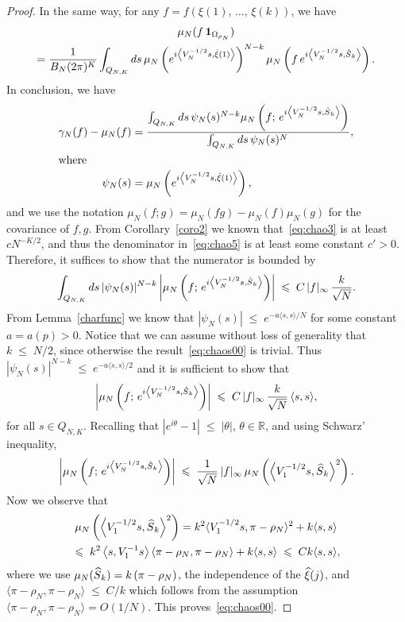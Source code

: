 \documentclass[AHL,Unicode,longabstracts,published]{cedram}
\renewcommand{\leq}{\;\leqslant\;}
\newcommand{\scalar}[2]{\langle #1, #2\rangle}
\newcommand{\ind}{\mathbf{1}}
\newcommand{\bbR}{\mathbb{R}}
\let\g=\gamma
\let\r=\rho
\let\O=\Omega
\let\oldhat\hat
\renewcommand*{\hat}[1]{\mathchoice{\widehat{#1}}{\widehat{#1}}{\oldhat{#1}}{\oldhat{#1}}}
\begin{document}
\begin{proof}
In the same way, for any $f=f(\xi(1),\,\dots,\,\xi(k))$, we have
\begin{multline}\label{eq:chao4}
\mu_N(f\,\ind_{\O_{\r_N}})\\
=\frac1{B_N(2\pi)^K}\int_{Q_{N,K}}d s \,\mu_N\left(e^{i\left\langle V_N^{-1/2} s,\hat\xi(1)\right\rangle}\right)^{N-k}\mu_N\left(f \,e^{i\left\langle V_N^{-1/2} s,\hat S_k\right\rangle}\right).
\end{multline}
In conclusion, we have
\begin{align}
\g_N(f)-\mu_N(f) &=\frac{\int_{Q_{N,K}}d s \,\psi_N(s)^{N-k}\mu_N\left(f; \,e^{i\left\langle V_N^{-1/2} s,\hat S_k\right\rangle}\right)}{
\int_{Q_{N,K}}d s \,\psi_N(s)^{N}\,},\label{eq:chao5}
\\
\intertext{where}
\psi_N(s) &=\mu_N\left(e^{i\left\langle V_N^{-1/2} s,\hat\xi(1)\right\rangle}\right),\nonumber
\end{align}
and we use the notation $\mu_N(f; g)=\mu_N(fg)-\mu_N(f)\mu_N(g)$ for the covariance of $f,g$. From Corollary~\ref{coro2} we known that~\eqref{eq:chao3} is at least $cN^{-K/2}$, and thus the denominator in~\eqref{eq:chao5} is at least some constant $c'>0$.
Therefore, it suffices to show that the numerator is bounded by
\begin{align}\label{eq:chao6}
\int_{Q_{N,K}}d s \,|\psi_N(s)|^{N-k}\left|\mu_N\left(f ;\,e^{i\left\langle V_N^{-1/2} s,\hat S_k\right\rangle}\right)\right|\leq C \,|f|_\infty\,\frac{k}{\sqrt N}.
\end{align}
From Lemma~\ref{charfunc} we know that $|\psi_N(s)|\leq e^{-a \scalar{s}{s}/N}$ for some constant $a=a(p)>0$. Notice that we can assume without loss of generality that $k\leq N/2$, since otherwise the result~\eqref{eq:chaos00} is trivial. Thus $|\psi_N(s)|^{N-k} \leq e^{-a \scalar{s}{s}/2}$ and it is sufficient to show that
\begin{align}\label{eq:chao7}
\left|\mu_N\left(f; \,e^{i\left\langle V_N^{-1/2} s,\hat S_k\right\rangle}\right)\right|\leq C \,|f|_\infty\,\frac{k}{\sqrt N}\,\scalar{s}{s},
\end{align}
for all $s\in Q_{N,K}$. Recalling that $|e^{i\theta}-1|\leq |\theta|$, $\theta\in\bbR$, and using Schwarz' inequality,
\begin{align}\label{eq:chao71}
\left|\mu_N\left(f; \,e^{i\left\langle V_N^{-1/2} s,\hat S_k\right\rangle}
\right)\right|
\leq \frac1{\sqrt N} \,|f|_\infty\,
\mu_N\left(\left\langle V_1^{-1/2} s,\hat S_k\right\rangle^2\right).
\end{align}
Now we observe that
\begin{multline}\label{eq:chao72}
\mu_N\left(\left\langle V_1^{-1/2} s,\hat S_k\right\rangle^2\right) = k^2\scalar{V_1^{-1/2} s}{\pi-\r_N}^2 + k \scalar{s}{s}
\\
 \leq k^2\left\langle s,V_1^{-1}s\right\rangle \left\langle\pi-\r_N,\pi-\r_N\right\rangle + k \scalar{s}{s} \leq Ck \scalar{s}{s},
\end{multline}
where we use $\mu_N(\hat S_k)=k\,(\pi-\r_N)$, the independence of the $\hat\xi(j)$, and $\scalar{\pi-\r_N}{\pi-\r_N}\leq C/k$ which follows from the assumption $\scalar{\pi-\r_N}{\pi-\r_N}=O(1/N)$. This proves~\eqref{eq:chaos00}.


\end{proof}
\end{document}
